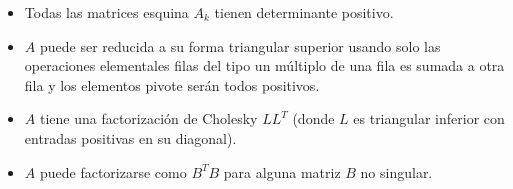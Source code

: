 \begin{frame}
\begin{theorem}
\begin{itemize}
			      $A$ es definida positiva.

			\item

			      Todas las matrices esquina $A_{k}$ tienen determinante
			      positivo.

			\item

			      $A$ puede ser reducida a su forma triangular superior
			      usando solo las operaciones elementales filas del tipo un
			      múltiplo de una fila es sumada a otra fila y los
			      elementos pivote serán todos positivos.

			\item

			      $A$ tiene una factorización de Cholesky $LL^{T}$
			      (donde $L$ es triangular inferior con entradas positivas
			      en su diagonal).

			\item

			      $A$ puede factorizarse como $B^{T}B$ para alguna matriz
			      $B$ no singular.
		\end{itemize}
	\end{theorem}
\end{frame}

